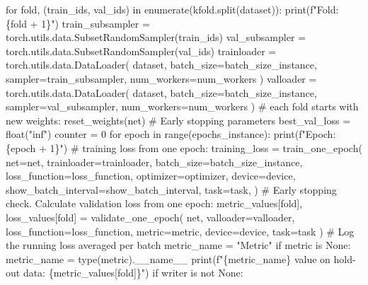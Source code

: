 \documentclass[
  letterpaper,
  DIV=11,
  numbers=noendperiod]{scrreprt}
\newenvironment{Shaded}{\begin{snugshade}}{\end{snugshade}}
\newcommand{\NormalTok}[1]{\textcolor[rgb]{0.00,0.23,0.31}{#1}}
\begin{document}
\begin{Shaded}
\begin{Highlighting}[]
\NormalTok{        for fold, (train\_ids, val\_ids) in enumerate(kfold.split(dataset)):}
\NormalTok{            print(f"Fold: \{fold + 1\}")}
\NormalTok{            train\_subsampler = torch.utils.data.SubsetRandomSampler(train\_ids)}
\NormalTok{            val\_subsampler = torch.utils.data.SubsetRandomSampler(val\_ids)}
\NormalTok{            trainloader = torch.utils.data.DataLoader(}
\NormalTok{                dataset, batch\_size=batch\_size\_instance, }
\NormalTok{                sampler=train\_subsampler, num\_workers=num\_workers}
\NormalTok{            )}
\NormalTok{            valloader = torch.utils.data.DataLoader(}
\NormalTok{                dataset, batch\_size=batch\_size\_instance, }
\NormalTok{                sampler=val\_subsampler, num\_workers=num\_workers}
\NormalTok{            )}
\NormalTok{            \# each fold starts with new weights:}
\NormalTok{            reset\_weights(net)}
\NormalTok{            \# Early stopping parameters}
\NormalTok{            best\_val\_loss = float("inf")}
\NormalTok{            counter = 0}
\NormalTok{            for epoch in range(epochs\_instance):}
\NormalTok{                print(f"Epoch: \{epoch + 1\}")}
\NormalTok{                \# training loss from one epoch:}
\NormalTok{                training\_loss = train\_one\_epoch(}
\NormalTok{                    net=net,}
\NormalTok{                    trainloader=trainloader,}
\NormalTok{                    batch\_size=batch\_size\_instance,}
\NormalTok{                    loss\_function=loss\_function,}
\NormalTok{                    optimizer=optimizer,}
\NormalTok{                    device=device,}
\NormalTok{                    show\_batch\_interval=show\_batch\_interval,}
\NormalTok{                    task=task,}
\NormalTok{                )}
\NormalTok{                \# Early stopping check. Calculate validation loss from one epoch:}
\NormalTok{                metric\_values[fold], loss\_values[fold] = validate\_one\_epoch(}
\NormalTok{                    net, valloader=valloader, loss\_function=loss\_function, }
\NormalTok{                    metric=metric, device=device, task=task}
\NormalTok{                )}
\NormalTok{                \# Log the running loss averaged per batch}
\NormalTok{                metric\_name = "Metric"}
\NormalTok{                if metric is None:}
\NormalTok{                    metric\_name = type(metric).\_\_name\_\_}
\NormalTok{                    print(f"\{metric\_name\} value on hold{-}out data: }
\NormalTok{                        \{metric\_values[fold]\}")}
\NormalTok{                if writer is not None:}

\end{Highlighting}
\end{Shaded}
\end{document}
